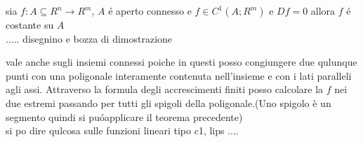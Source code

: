 \proposition
sia $f:A\subseteq R^n \rightarrow R^m$, $A$ \'e aperto connesso e $f\in C^1(A;R^m)$ e $Df=0$ allora $f$ \'e costante su $A$\\
..... disegnino e bozza di dimostrazione

\observation vale anche sugli insiemi connessi poiche in questi posso congiungere due qulunque punti con una poligonale interamente contenuta nell'insieme e con i lati paralleli agli assi. Attraverso la formula degli accrescimenti finiti posso calcolare la $f$ nei due estremi passando per tutti gli spigoli della poligonale.(Uno spigolo è un segmento quindi si pu\'oapplicare il teorema precedente)\\

si po dire qulcosa sulle funzioni lineari tipo c1, lips ....\\

